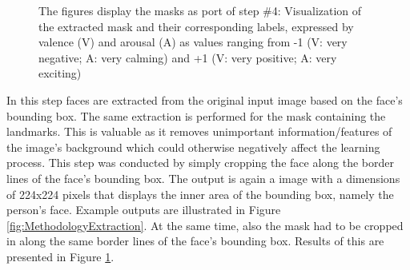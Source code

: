\begin{figure}[H]
  \hfill
  \caption[ER pipeline step \#4: Mask extraction]{The figures display the masks as port of step \#4: Visualization of the extracted mask and their corresponding labels, expressed by valence (V) and arousal (A) as values ranging from -1 (V: very negative; A: very calming) and +1 (V: very positive; A: very exciting)}
  \label{fig:MethodologyExtractionMask}
\end{figure}

In this step faces are extracted from the original input image based on the face's bounding box. The same extraction is performed for the mask containing the landmarks. This is valuable as it removes unimportant information/features of the image's background which could otherwise negatively affect the learning process.
\newline\newline
This step was conducted by simply cropping the face along the border lines of the face's bounding box. The output is again a image with a dimensions of 224x224 pixels that displays the inner area of the bounding box, namely the person's face. Example outputs are illustrated in Figure \ref{fig:MethodologyExtraction}. At the same time, also the mask had to be cropped in along the same border lines of the face's bounding box. Results of this are presented in Figure \ref{fig:MethodologyExtractionMask}.



